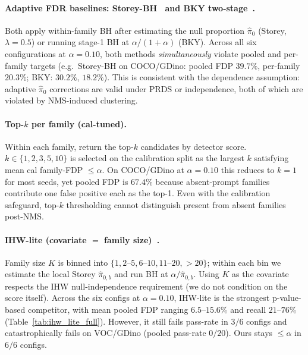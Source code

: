 \documentclass{article}
\theoremstyle{remark}
\newcommand{\1}{\mathbf{1}}
\begin{document}
\paragraph{Adaptive FDR baselines: Storey-BH~\cite{storey2002direct}
and BKY two-stage~\cite{benjamini2006adaptive}.}
Both apply within-family BH after estimating the null proportion
$\hat\pi_0$ (Storey, $\lambda\!=\!0.5$) or running stage-1 BH at
$\alpha/(1{+}\alpha)$ (BKY). Across all six configurations at
$\alpha\!=\!0.10$, both methods \emph{simultaneously} violate pooled
and per-family targets (e.g.\ Storey-BH on COCO/GDino:
pooled FDP $39.7\%$, per-family $20.3\%$; BKY: $30.2\%$, $18.2\%$).
This is consistent with the dependence assumption: adaptive
$\hat\pi_0$ corrections are valid under PRDS or independence, both of
which are violated by NMS-induced clustering.

\paragraph{Top-$k$ per family (cal-tuned).}
Within each family, return the top-$k$ candidates by detector score.
$k\!\in\!\{1,2,3,5,10\}$ is selected on the calibration split as the
largest $k$ satisfying mean cal family-FDP $\le\alpha$. On
COCO/GDino at $\alpha\!=\!0.10$ this reduces to $k\!=\!1$ for most
seeds, yet pooled FDP is $67.4\%$ because absent-prompt families
contribute one false positive each as the top-1. Even with the
calibration safeguard, top-$k$ thresholding cannot distinguish
present from absent families post-NMS.

\paragraph{IHW-lite (covariate $=$ family size)~\cite{ignatiadis2016data}.}
Family size $K$ is binned into $\{1, 2$--$5, 6$--$10, 11$--$20, {>}20\}$;
within each bin we estimate the local Storey $\hat\pi_{0,b}$ and run
BH at $\alpha/\hat\pi_{0,b}$. Using $K$ as the covariate respects
the IHW null-independence requirement (we do not condition on the
score itself). Across the six configs at $\alpha\!=\!0.10$, IHW-lite
is the strongest p-value-based competitor, with mean pooled FDP
ranging $6.5$--$15.6\%$ and recall $21$--$76\%$
(Table~\ref{tab:ihw_lite_full}). However, it still fails pass-rate
in $3/6$ configs and catastrophically fails on VOC/GDino
(pooled pass-rate $0/20$). Ours stays $\le\alpha$ in $6/6$ configs.
\end{document}

